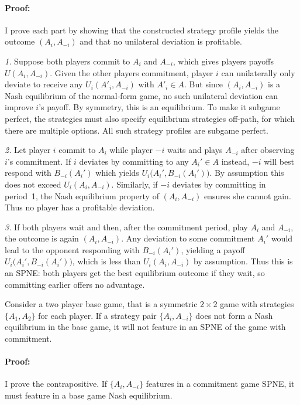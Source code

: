 \documentclass[../paper.tex]{subfiles}
\begin{document}
\paragraph{Proof:} I prove each part by showing that the constructed strategy profile yields the outcome $(A_i,A_{-i})$ and that no unilateral deviation is profitable.
 
\textit{1.} Suppose both players commit to $A_i$ and $A_{-i}$, which gives players payoffs $U(A_i,A_{-i})$. Given the other players commitment, player $i$ can unilaterally only deviate to receive any $U_i(A'_i,A_{-i})$ with $A'_i\in A$. But since $(A_i,A_{-i})$ is a Nash equilibrium of the normal‐form game, no such unilateral deviation can improve $i$'s payoff. By symmetry, this is an equilibrium. To make it subgame perfect, the strategies must also specify equilibrium strategies off-path, for which there are multiple options. All such strategy profiles are subgame perfect.
 
\textit{2.} Let player $i$ commit to $A_i$ while player $-i$ waits and plays $A_{-i}$ after observing $i$’s commitment. If $i$ deviates by committing to any $A_i'\in A$ instead, $-i$ will best respond with $B_{-i}(A_i')$ which yields $U_i\bigl(A_i',B_{-i}(A_i')\bigr)$. By assumption this does not exceed $U_i(A_i,A_{-i})$. Similarly, if $-i$ deviates by committing in period~1, the Nash equilibrium property of $(A_i,A_{-i})$ ensures she cannot gain. Thus no player has a profitable deviation.
 
\textit{3.} If both players wait and then, after the commitment period, play $A_i$ and $A_{-i}$, the outcome is again $(A_i,A_{-i})$. Any deviation to some commitment $A_i'$ would lead to the opponent responding with $B_{-i}(A_i')$, yielding a payoff $U_i\bigl(A_i',B_{-i}(A_i')\bigr)$, which is less than $ U_i(A_i,A_{-i})$ by assumption. Thus this is an SPNE: both players get the best equilibrium outcome if they wait, so committing earlier offers no advantage.
\begin{lemma}\label{lem:SPNE_characterization_2}
    Consider a two player base game, that is a symmetric $2\times2$ game with strategies $\{A_1,A_2\}$ for each player. If a strategy pair $\{A_i,A_{-i}\}$ does not form a Nash equilibrium in the base game, it will not feature in an SPNE of the game with commitment.
\end{lemma}
\paragraph{Proof:}
I prove the contrapositive. If $\{A_i,A_{-i}\}$ features in a commitment game SPNE, it must feature in a base game Nash equilibrium.
 
\end{document}
